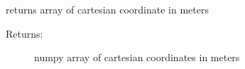 \documentclass[letterpaper,10pt,english]{sphinxmanual}
\begin{document}
\begin{fulllineitems}
\begin{fulllineitems}
\begin{description}
\end{description}

\end{fulllineitems}


\begin{fulllineitems}
\label{TRIPPy:TRIPPy.beam.Beam.x}
returns array of cartesian coordinate in meters
\begin{description}
\item[{Returns:}] \leavevmode
numpy array of cartesian coordinates in meters

\end{description}

\end{fulllineitems}


\end{fulllineitems}

\end{document}
